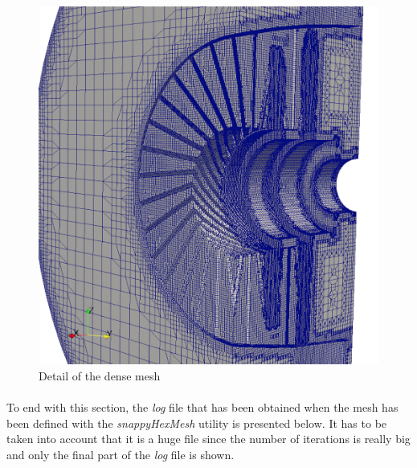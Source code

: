 \begin{figure}[h!]
\includegraphics[scale=0.4]{./mesh/newmesh/dense2ok}
\centering
\caption{Detail of the dense mesh}
\label{dense3}
\end{figure}

\paragraph{}To end with this section, the \textit{log} file that has been obtained when the mesh has been defined with the \textit{snappyHexMesh} utility is presented below. It has to be taken into account that it is a huge file since the number of iterations is really big and only the final part of the \textit{log} file is shown.

